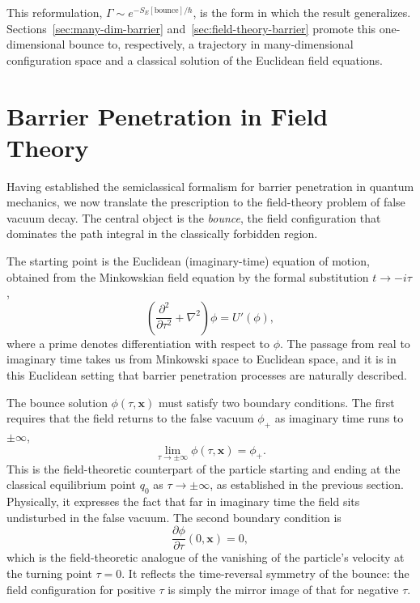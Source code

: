 This reformulation, $\Gamma \sim e^{-S_E[\text{bounce}]/\hbar}$, is the form in which the result generalizes. Sections~\ref{sec:many-dim-barrier} and~\ref{sec:field-theory-barrier} promote this one-dimensional bounce to, respectively, a trajectory in many-dimensional configuration space and a classical solution of the Euclidean field equations.

\section{Barrier Penetration in Field Theory}

Having established the semiclassical formalism for barrier penetration in
quantum mechanics, we now translate the prescription to the field-theory
problem of false vacuum decay. The central object is the \textit{bounce},
the field configuration that dominates the path integral in the classically
forbidden region.

The starting point is the Euclidean (imaginary-time) equation of motion,
obtained from the Minkowskian field equation by the formal substitution
$t \to -i\tau$,
\begin{equation}
    \left(\frac{\partial^{2}}{\partial\tau^{2}}+\nabla^{2}\right)\phi
    =U'(\phi),
    \label{eq:euclidean_eom}
\end{equation}
where a prime denotes differentiation with respect to $\phi$. The passage
from real to imaginary time takes us from Minkowski space to Euclidean
space, and it is in this Euclidean setting that barrier penetration
processes are naturally described.

The bounce solution $\phi(\tau,\mathbf{x})$ must satisfy two boundary
conditions. The first requires that the field returns to the false vacuum
$\phi_{+}$ as imaginary time runs to $\pm\infty$,
\begin{equation}
    \lim_{\tau\to\pm\infty}\phi(\tau,\mathbf{x})=\phi_{+}.
    \label{eq:bc_tau}
\end{equation}
This is the field-theoretic counterpart of the particle starting and
ending at the classical equilibrium point $q_{0}$ as $\tau\to\pm\infty$,
as established in the previous section. Physically, it expresses the fact
that far in imaginary time the field sits undisturbed in the false vacuum.
The second boundary condition is
\begin{equation}
    \frac{\partial\phi}{\partial\tau}(0,\mathbf{x})=0,
    \label{eq:bc_dtau}
\end{equation}
which is the field-theoretic analogue of the vanishing of the particle's
velocity at the turning point $\tau=0$. It reflects the time-reversal
symmetry of the bounce: the field configuration for positive $\tau$ is
simply the mirror image of that for negative $\tau$.

